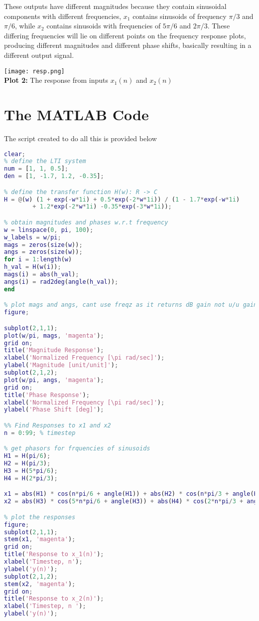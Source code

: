 \documentclass[]{report}
\begin{document}
These outputs have different magnitudes because they contain sinusoidal components with different frequencies, $x_1$ contains sinusoids of frequency $\pi/3$ and $\pi/6$, while $x_2$ contains sinusoids with frequencies of $5\pi/6$ and $2\pi/3$. These differing frequencies will lie on different points on the frequency response plots, producing different magnitudes and different phase shifts, basically resulting in a different output signal.

\begin{center}
	\texttt{[image: resp.png]} \\ \vspace{1em}
	\textbf{Plot 2:} The response from inputs  $x_1(n)$ and $x_2(n)$
\end{center}

\section*{The MATLAB Code}
The script created to do all this is provided below
\begin{lstlisting}[frame=single, language=Matlab]
%% Frequency Response 
clear;
% define the LTI system
num = [1, 1, 0.5];
den = [1, -1.7, 1.2, -0.35];

% define the transfer function H(w): R -> C
H = @(w) (1 + exp(-w*1i) + 0.5*exp(-2*w*1i)) / (1 - 1.7*exp(-w*1i) 
		+ 1.2*exp(-2*w*1i) -0.35*exp(-3*w*1i));

% obtain magnitudes and phases w.r.t frequency
w = linspace(0, pi, 100);
w_labels = w/pi;
mags = zeros(size(w));
angs = zeros(size(w));
for i = 1:length(w)
h_val = H(w(i));
mags(i) = abs(h_val);
angs(i) = rad2deg(angle(h_val));
end

% plot mags and angs, cant use freqz as it returns dB gain not u/u gain
figure;

subplot(2,1,1);
plot(w/pi, mags, 'magenta');
grid on;
title('Magnitude Response');
xlabel('Normalized Frequency [\pi rad/sec]');
ylabel('Magnitude [unit/unit]');
subplot(2,1,2);
plot(w/pi, angs, 'magenta');
grid on;
title('Phase Response');
xlabel('Normalized Frequency [\pi rad/sec]');
ylabel('Phase Shift [deg]');

%% Find Responses to x1 and x2
n = 0:99; % timestep

% get phasors for frquencies of sinusoids
H1 = H(pi/6);
H2 = H(pi/3);
H3 = H(5*pi/6);
H4 = H(2*pi/3);

x1 = abs(H1) * cos(n*pi/6 + angle(H1)) + abs(H2) * cos(n*pi/3 + angle(H2));
x2 = abs(H3) * cos(5*n*pi/6 + angle(H3)) + abs(H4) * cos(2*n*pi/3 + angle(H4));

% plot the responses
figure;
subplot(2,1,1);
stem(x1, 'magenta');
grid on;
title('Response to x_1(n)');
xlabel('Timestep, n');
ylabel('y(n)');
subplot(2,1,2);
stem(x2, 'magenta');
grid on;
title('Response to x_2(n)');
xlabel('Timestep, n ');
ylabel('y(n)');
\end{lstlisting}
\end{document}

